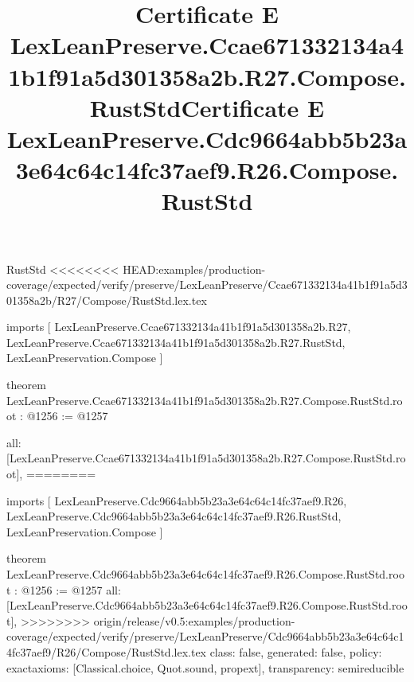 \begin{lexlean}{RustStd}
<<<<<<<< HEAD:examples/production-coverage/expected/verify/preserve/LexLeanPreserve/Ccae671332134a41b1f91a5d301358a2b/R27/Compose/RustStd.lex.tex
\title{Certificate E LexLeanPreserve.Ccae671332134a41b1f91a5d301358a2b.R27.Compose.RustStd}
\begin{coremodule}
imports [
  LexLeanPreserve.Ccae671332134a41b1f91a5d301358a2b.R27,
  LexLeanPreserve.Ccae671332134a41b1f91a5d301358a2b.R27.RustStd,
  LexLeanPreservation.Compose
]

theorem LexLeanPreserve.Ccae671332134a41b1f91a5d301358a2b.R27.Compose.RustStd.root : @1256 := @1257 {
  all: [LexLeanPreserve.Ccae671332134a41b1f91a5d301358a2b.R27.Compose.RustStd.root],
========
\title{Certificate E LexLeanPreserve.Cdc9664abb5b23a3e64c64c14fc37aef9.R26.Compose.RustStd}
\begin{coremodule}
imports [
  LexLeanPreserve.Cdc9664abb5b23a3e64c64c14fc37aef9.R26,
  LexLeanPreserve.Cdc9664abb5b23a3e64c64c14fc37aef9.R26.RustStd,
  LexLeanPreservation.Compose
]

theorem LexLeanPreserve.Cdc9664abb5b23a3e64c64c14fc37aef9.R26.Compose.RustStd.root : @1256 := @1257 {
  all: [LexLeanPreserve.Cdc9664abb5b23a3e64c64c14fc37aef9.R26.Compose.RustStd.root],
>>>>>>>> origin/release/v0.5:examples/production-coverage/expected/verify/preserve/LexLeanPreserve/Cdc9664abb5b23a3e64c64c14fc37aef9/R26/Compose/RustStd.lex.tex
  class: false,
  generated: false,
  policy: exact{axioms: [Classical.choice, Quot.sound, propext]},
  transparency: semireducible
}


\end{coremodule}}
\end{coremodule}
\end{lexlean}
